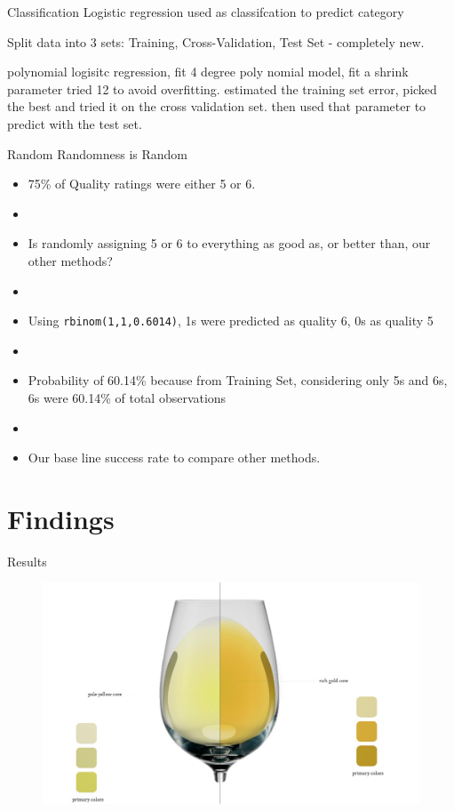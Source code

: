 \documentclass{beamer}
\begin{document}
\begin{frame}{Classification}
	Logistic regression used as classifcation to predict category 
	
	Split data into 3 sets: Training, Cross-Validation, Test Set - completely new. 
	
	polynomial logisitc regression, fit 4 degree poly nomial model, fit a shrink parameter tried 12 to avoid overfitting. estimated the training set error, picked the best and tried it on the cross validation set. then used that parameter to predict with the test set. 
	

\end{frame}

\begin{frame}{Random Randomness is Random}
	\begin{itemize}
	\item 75\% of Quality ratings were either 5 or 6. 
	\item[]
	\item Is randomly assigning 5 or 6 to everything as good as, or better than, our other methods?
	\item[]
	\item Using \texttt{rbinom(1,1,0.6014)}, 1s were predicted as quality 6, 0s as quality 5
	\item[]
	\item Probability of 60.14\% because from Training Set, considering only 5s and 6s, 6s were 60.14\% of total observations
	\item[]
	\item Our base line success rate to compare other methods.
	\end{itemize}
\end{frame}


\section{Findings}
\begin{frame}{Results}
	\begin{figure}
		\centering
		\includegraphics[width=\textwidth]{../images/matching.jpg}
	\end{figure}
\end{frame}
\end{document}
